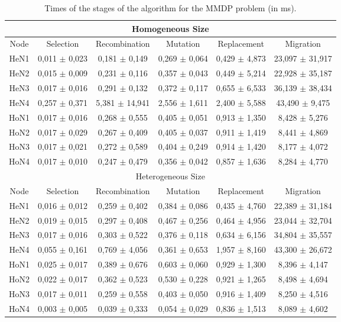 \begin{table*}
\centering
\caption{Times of the stages of the algorithm for the MMDP problem (in ms).}
\begin{tabular}{|c|c|c|c|c|c|} \hline
\multicolumn{6}{|c|}{Homogeneous Size} \\ \hline
Node	& Selection		& Recombination		& Mutation		& Replacement		& Migration	        \\ \hline
HeN1	& 0,011 $\pm$ 0,023	& 0,181	$\pm$ 0,149	& 0,269	$\pm$ 0,064	& 0,429	$\pm$ 4,873	& 23,097 $\pm$ 	31,917 \\ \hline
HeN2	& 0,015	$\pm$ 0,009	& 0,231	$\pm$ 0,116	& 0,357	$\pm$ 0,043	& 0,449	$\pm$ 5,214	& 22,928 $\pm$ 	35,187 \\ \hline
HeN3	& 0,017	$\pm$ 0,016	& 0,291	$\pm$ 0,132	& 0,372	$\pm$ 0,117	& 0,655	$\pm$ 6,533	& 36,139 $\pm$ 	38,434 \\ \hline
HeN4	& 0,257	$\pm$ 0,371	& 5,381	$\pm$ 14,941	& 2,556	$\pm$ 1,611	& 2,400	$\pm$ 5,588	& 43,490 $\pm$ 	9,475 \\ \hline \hline
HoN1	& 0,017	$\pm$ 0,016	& 0,268	$\pm$ 0,555	& 0,405	$\pm$ 0,051	& 0,913	$\pm$ 1,350	& 8,428	$\pm$ 5,276 \\ \hline
HoN2	& 0,017	$\pm$ 0,029	& 0,267	$\pm$ 0,409	& 0,405	$\pm$ 0,037	& 0,911	$\pm$ 1,419	& 8,441	$\pm$ 4,869 \\ \hline
HoN3	& 0,017	$\pm$ 0,021	& 0,272	$\pm$ 0,589	& 0,404	$\pm$ 0,249	& 0,914	$\pm$ 1,420	& 8,177	$\pm$ 4,072 \\ \hline
HoN4	& 0,017	$\pm$ 0,010	& 0,247	$\pm$ 0,479	& 0,356	$\pm$ 0,042	& 0,857	$\pm$ 1,636	& 8,284	$\pm$ 4,770 \\ \hline
\multicolumn{6}{|c|}{Heterogeneous Size} \\ \hline									
Node	& Selection		& Recombination		& Mutation		& Replacement		& Migration	\\ \hline
HeN1	& 0,016	$\pm$ 0,012	& 0,259	$\pm$ 0,402	& 0,384	$\pm$ 0,086	& 0,435	$\pm$ 4,760	& 22,389 $\pm$ 	31,184 \\ \hline
HeN2	& 0,019	$\pm$ 0,015	& 0,297	$\pm$ 0,408	& 0,467	$\pm$ 0,256	& 0,464	$\pm$ 4,956	& 23,044 $\pm$ 	32,704 \\ \hline
HeN3	& 0,017	$\pm$ 0,016	& 0,303	$\pm$ 0,522	& 0,376	$\pm$ 0,118	& 0,634	$\pm$ 6,156	& 34,804 $\pm$ 	35,557 \\ \hline
HeN4	& 0,055	$\pm$ 0,161	& 0,769	$\pm$ 4,056	& 0,361	$\pm$ 0,653	& 1,957	$\pm$ 8,160	& 43,300 $\pm$ 	26,672 \\ \hline \hline
HoN1	& 0,025	$\pm$ 0,017	& 0,389	$\pm$ 0,676	& 0,603	$\pm$ 0,060	& 0,929	$\pm$ 1,300	& 8,396	$\pm$ 4,147 \\ \hline
HoN2	& 0,022	$\pm$ 0,017	& 0,362	$\pm$ 0,523	& 0,530	$\pm$ 0,228	& 0,921	$\pm$ 1,265	& 8,498	$\pm$ 4,694 \\ \hline
HoN3	& 0,017	$\pm$ 0,011	& 0,259	$\pm$ 0,558	& 0,403	$\pm$ 0,050	& 0,916	$\pm$ 1,409	& 8,250	$\pm$ 4,516 \\ \hline
HoN4	& 0,003	$\pm$ 0,005	& 0,039	$\pm$ 0,333	& 0,054	$\pm$ 0,029	& 0,836	$\pm$ 1,513	& 8,089	$\pm$ 4,602 \\ \hline
\end{tabular}
\label{tab:mmdptimes}
\end{table*}

